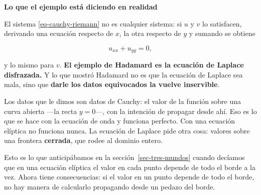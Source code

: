 \documentclass[
  spanish,
  a4paper,
]{scrbook}
\theoremstyle{definition}
\theoremstyle{plain}
\theoremstyle{definition}
\theoremstyle{plain}
\theoremstyle{definition}
\theoremstyle{remark}
\begin{document}
\begin{tcolorbox}[enhanced jigsaw, arc=.35mm, bottomrule=.15mm, breakable, colback=white, colframe=quarto-callout-important-color-frame, left=2mm, leftrule=.75mm, opacityback=0, rightrule=.15mm, toprule=.15mm]
\begin{minipage}[t]{5.5mm}
\textcolor{quarto-callout-important-color}{\faExclamation}
\end{minipage}%
\begin{minipage}[t]{\textwidth - 5.5mm}

\vspace{-3mm}\textbf{Lo que el ejemplo está diciendo en realidad}\vspace{3mm}

El sistema \ref{eq-cauchy-riemann} no es cualquier sistema: si \(u\) y
\(v\) lo satisfacen, derivando una ecuación respecto de \(x\), la otra
respecto de \(y\) y sumando se obtiene

\[
u_{xx} + u_{yy} = 0 ,
\]

y lo mismo para \(v\). \textbf{El ejemplo de Hadamard es la ecuación de
Laplace disfrazada.} Y lo que mostró Hadamard no es que la ecuación de
Laplace sea mala, sino que \textbf{darle los datos equivocados la vuelve
inservible}.

Los datos que le dimos son datos de Cauchy: el valor de la función sobre
una curva abierta ---la recta \(y=0\)---, con la intención de propagar
desde ahí. Eso es lo que se hace con la ecuación de onda y funciona
perfecto. Con una ecuación elíptica no funciona nunca. La ecuación de
Laplace pide otra cosa: valores sobre una frontera \textbf{cerrada}, que
rodee al dominio entero.

Esto es lo que anticipábamos en la sección~\ref{sec-tres-mundos} cuando
decíamos que en una ecuación elíptica el valor en cada punto depende de
todo el borde a la vez. Ahora tiene consecuencias: si el valor en un
punto depende de todo el borde, no hay manera de calcularlo propagando
desde un pedazo del borde.

\end{minipage}%
\end{tcolorbox}
\end{document}
